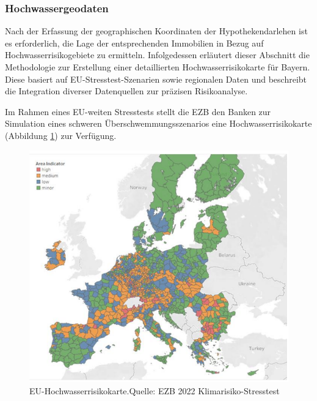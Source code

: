 \subsubsection{Hochwassergeodaten}
Nach der Erfassung der geographischen Koordinaten der Hypothekendarlehen ist es erforderlich, die Lage der entsprechenden Immobilien in Bezug auf Hochwasserrisikogebiete zu ermitteln. Infolgedessen erläutert dieser Abschnitt die Methodologie zur Erstellung einer detaillierten Hochwasserrisikokarte für Bayern. Diese basiert auf EU-Stresstest-Szenarien sowie regionalen Daten und beschreibt die Integration diverser Datenquellen zur präzisen Risikoanalyse.

Im Rahmen eines EU-weiten Stresstests stellt die \ac{EZB} den Banken zur Simulation eines schweren Überschwemmungsszenarios eine Hochwasserrisikokarte (Abbildung \ref{fig:euflut}) zur Verfügung.

\begin{figure}[htbp]
    \centering
    \includegraphics[width=\textwidth]{figures/euflood.png} 
    \caption{EU-Hochwasserrisikokarte.Quelle: EZB 2022 Klimarisiko-Stresstest}
    \label{fig:euflut}
\end{figure}


